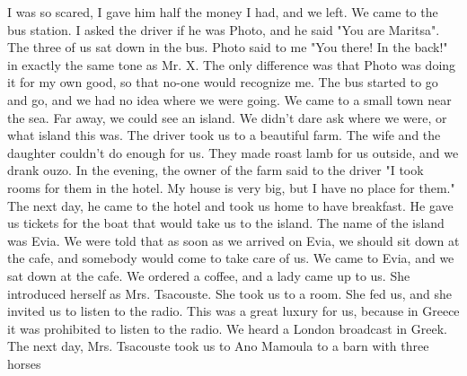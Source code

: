 I was so 
scared, I gave him half the money I had, and we left.
We came to the bus station.
I asked the driver if he was Photo, 
and he said "You are Maritsa".
The three of us sat down in the bus.
Photo said to me "You there!
In the back!"
in exactly the same tone as 
Mr.
X. The only difference was that Photo was doing it for my own good, 
so that no-one would recognize me.
The bus started to go and go, and we had no idea where we were going.
We came to a small town near the sea.
Far away, we could see an island.
We didn't dare ask where we were, or what island this was.
The driver took us to a beautiful farm.
The wife and the daughter couldn't 
do enough for us.
They made roast lamb for us outside, and we drank 
ouzo.
In the evening, the owner of the farm said to the driver "I took 
rooms for them in the hotel.
My house is very big, but I have no place 
for them."
The next day, he came to the hotel and took us home to have 
breakfast.
He gave us tickets for the boat that would take us to the 
island.
The name of the island was Evia.
We were told that as soon as 
we arrived on Evia, we should sit down at the cafe, and somebody would 
come to take care of us.
We came to Evia, and we sat down at the cafe.
We ordered a coffee, 
and a lady came up to us.
She introduced herself as Mrs.
Tsacouste.
She
took us to a room.
She fed us, and she invited us to listen to the radio.
This was a great luxury for us, because in Greece it was prohibited to 
listen to the radio.
We heard a London broadcast in Greek.
The next 
day, Mrs.
Tsacouste took us to Ano Mamoula to a barn with three horses 

